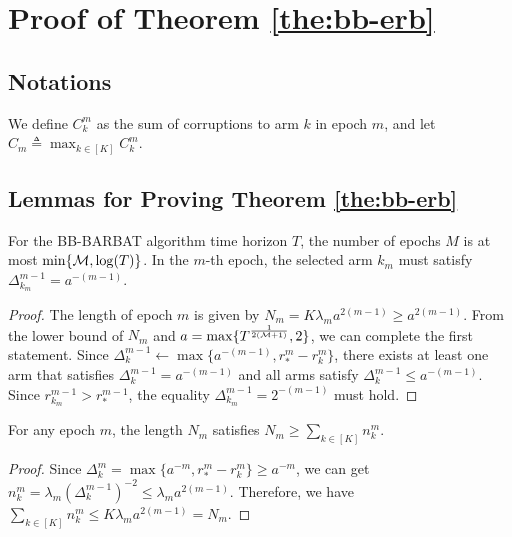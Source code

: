  \section{Proof of Theorem \ref{the:bb-erb}}
\label{ape:bb}

\subsection{Notations}
We define $C_k^m$ as the sum of corruptions to arm $k$ in epoch $m$, and let $C_m \triangleq \max_{k \in [K]}C_k^m$.

\subsection{Lemmas for Proving Theorem \ref{the:bb-erb}}

\begin{lemma}
\label{lem:tnebb} %
    For the BB-BARBAT algorithm time horizon $T$, the number of epochs $M$ is at most $\min \{{\mathcal{M}}, \log(T)\}$. In the $m$-th epoch, the selected arm $k_m$ must satisfy $\Delta_{k_m}^{m-1} = a^{-(m-1)}$.
\end{lemma}
\begin{proof}
    The length of epoch $m$ is given by $N_m = K \lambda_m a^{2(m-1)} \geq a^{2(m-1)}$. From the lower bound of $N_m$ and $a = \max \{T^{\frac{1}{2({\mathcal{M}} + 1)}}, 2\}$, we can complete the first statement. Since $\Delta_k^{m-1} \leftarrow \max\{a^{-(m-1)}, r_*^m - r_k^m\}$, there exists at least one arm that satisfies $\Delta_k^{m-1} = a^{-(m-1)}$ and all arms satisfy $\Delta_k^{m-1} \leq a^{-(m-1)}$. Since $r_{k_m}^{m-1} > r_{*}^{m-1}$, the equality $\Delta_{k_m}^{m-1} = 2^{-(m-1)}$ must hold.
\end{proof}

\begin{lemma}
\label{lem:bb-rkc} %
    For any epoch $m$, the length $N_m$ satisfies $N_m \geq \sum_{k \in [K]} n_k^m$.
\end{lemma}
\begin{proof}
    Since $\Delta_k^m = \max \{a^{-m}, r_*^m - r_k^m\} \geq a^{-m}$, we can get
    $n_k^m = \lambda_m (\Delta_k^{m-1})^{-2} \leq \lambda_m a^{2(m-1)}.$
    Therefore, we have
    $\sum_{k \in [K]}n_k^m \leq K \lambda_m a^{2(m-1)} = N_m.$
\end{proof}

